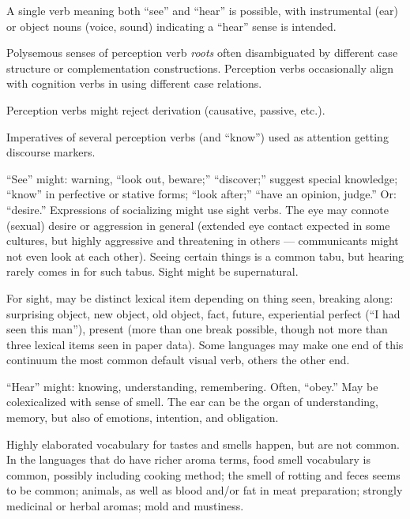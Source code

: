 \documentclass[11pt]{article}
\begin{document}
A single verb meaning both ``see'' and ``hear'' is possible, with
instrumental (ear) or object nouns (voice, sound) indicating a
``hear'' sense is intended.

Polysemous senses of perception verb \textit{roots} often
disambiguated by different case structure or complementation
constructions.  Perception verbs occasionally align with cognition
verbs in using different case relations.

Perception verbs might reject derivation (causative, passive, etc.).

Imperatives of several perception verbs (and ``know'') used as
attention getting discourse markers.

``See'' might: warning, ``look out, beware;'' ``discover;'' suggest
special knowledge; ``know'' in perfective or stative forms; ``look
after;'' ``have an opinion, judge.'' Or: ``desire.''  Expressions of
socializing might use sight verbs.  The eye may connote (sexual)
desire or aggression in general (extended eye contact expected in some
cultures, but highly aggressive and threatening in others —
communicants might not even look at each other).  Seeing certain
things is a common tabu, but hearing rarely comes in for such tabus.
Sight might be supernatural.

For sight, may be distinct lexical item depending on thing seen,
breaking along: surprising object, new object, old object, fact,
future, experiential perfect (``I had seen this man''), present (more
than one break possible, though not more than three lexical items seen
in paper data).  Some languages may make one end of this continuum the
most common default visual verb, others the other end.

``Hear'' might: knowing, understanding, remembering.  Often, ``obey.''
May be colexicalized with sense of smell.  The ear can be the organ of
understanding, memory, but also of emotions, intention, and obligation.

Highly elaborated vocabulary for tastes and smells happen, but are not
common.  In the languages that do have richer aroma terms, food smell
vocabulary is common, possibly including cooking method; the smell of
rotting and feces seems to be common; animals, as well as blood and/or
fat in meat preparation; strongly medicinal or herbal aromas; mold and
mustiness.
\end{document}
